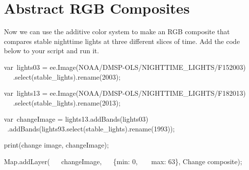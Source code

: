 \documentclass[
  letterpaper,
  DIV=11,
  numbers=noendperiod]{scrreprt}
\newenvironment{Shaded}{\begin{snugshade}}{\end{snugshade}}
\newcommand{\AttributeTok}[1]{\textcolor[rgb]{0.40,0.45,0.13}{#1}}
\newcommand{\BuiltInTok}[1]{\textcolor[rgb]{0.00,0.23,0.31}{#1}}
\newcommand{\DataTypeTok}[1]{\textcolor[rgb]{0.68,0.00,0.00}{#1}}
\newcommand{\DecValTok}[1]{\textcolor[rgb]{0.68,0.00,0.00}{#1}}
\newcommand{\FunctionTok}[1]{\textcolor[rgb]{0.28,0.35,0.67}{#1}}
\newcommand{\NormalTok}[1]{\textcolor[rgb]{0.00,0.23,0.31}{#1}}
\newcommand{\OperatorTok}[1]{\textcolor[rgb]{0.37,0.37,0.37}{#1}}
\newcommand{\StringTok}[1]{\textcolor[rgb]{0.13,0.47,0.30}{#1}}
\begin{document}
\hypertarget{abstract-rgb-composites}{%
\section{Abstract RGB Composites ~}\label{abstract-rgb-composites}}

Now we can use the additive color system to make an RGB composite that
compares stable nighttime lights at three different slices of time. Add
the code below to your script and run it. ~

\begin{Shaded}
\begin{Highlighting}[]
\NormalTok{var lights03 }\OperatorTok{=}\NormalTok{ ee}\OperatorTok{.}\FunctionTok{Image}\NormalTok{(}\StringTok{\textquotesingle{}NOAA/DMSP{-}OLS/NIGHTTIME\_LIGHTS/F152003\textquotesingle{}}\NormalTok{)  }
  \AttributeTok{ }\OperatorTok{.}\FunctionTok{select}\NormalTok{(}\StringTok{\textquotesingle{}stable\_lights\textquotesingle{}}\NormalTok{)}\OperatorTok{.}\FunctionTok{rename}\NormalTok{(}\StringTok{\textquotesingle{}2003\textquotesingle{}}\NormalTok{)}\OperatorTok{;}  
  
\NormalTok{var lights13 }\OperatorTok{=}\NormalTok{ ee}\OperatorTok{.}\FunctionTok{Image}\NormalTok{(}\StringTok{\textquotesingle{}NOAA/DMSP{-}OLS/NIGHTTIME\_LIGHTS/F182013\textquotesingle{}}\NormalTok{)  }
  \AttributeTok{ }\OperatorTok{.}\FunctionTok{select}\NormalTok{(}\StringTok{\textquotesingle{}stable\_lights\textquotesingle{}}\NormalTok{)}\OperatorTok{.}\FunctionTok{rename}\NormalTok{(}\StringTok{\textquotesingle{}2013\textquotesingle{}}\NormalTok{)}\OperatorTok{;}  
  
\NormalTok{var changeImage }\OperatorTok{=}\NormalTok{ lights13}\OperatorTok{.}\FunctionTok{addBands}\NormalTok{(lights03)  }
  \AttributeTok{ }\OperatorTok{.}\FunctionTok{addBands}\NormalTok{(lights93}\OperatorTok{.}\FunctionTok{select}\NormalTok{(}\StringTok{\textquotesingle{}stable\_lights\textquotesingle{}}\NormalTok{)}\OperatorTok{.}\FunctionTok{rename}\NormalTok{(}\StringTok{\textquotesingle{}1993\textquotesingle{}}\NormalTok{))}\OperatorTok{;}  
  
\FunctionTok{print}\NormalTok{(}\StringTok{\textquotesingle{}change image\textquotesingle{}}\OperatorTok{,}\NormalTok{ changeImage)}\OperatorTok{;}  
  
\BuiltInTok{Map}\OperatorTok{.}\FunctionTok{addLayer}\NormalTok{(  }
\NormalTok{   changeImage}\OperatorTok{,}  
\NormalTok{   \{}\DataTypeTok{min}\OperatorTok{:} \DecValTok{0}\OperatorTok{,}  
    \DataTypeTok{max}\OperatorTok{:} \DecValTok{63}\NormalTok{\}}\OperatorTok{,}
    \StringTok{\textquotesingle{}Change composite\textquotesingle{}}\NormalTok{)}\OperatorTok{;}
\end{Highlighting}
\end{Shaded}
\end{document}
